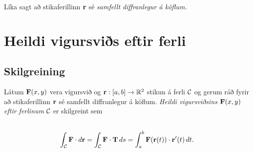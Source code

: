 \documentclass[a4paper,10pt,icelandic]{sphinxmanual}
\begin{document}
Líka sagt að stikaferillinn \(\mbox{${\bf r}$}\) sé \emph{samfellt
diffranlegur á köflum.}


\section{Heildi vigursviðs eftir ferli}
\label{Kafli5:heildi-vigursvis-eftir-ferli}

\subsection{Skilgreining}
\label{Kafli5:id8}
Látum \(\mbox{${\bf F}$}(x,y)\) vera vigursvið og
\(\mbox{${\bf r}$}:[a,b]\rightarrow {\mathbb  R}^2\) stikun á ferli
\(\cal C\) og gerum ráð fyrir að stikaferillinn
\(\mbox{${\bf r}$}\) sé samfellt diffranlegur á köflum. \emph{Heildi
vigursviðsins} \(\mbox{${\bf F}$}(x,y)\) \emph{eftir ferlinum}
\(\cal C\) er skilgreint sem
\begin{gather}
\begin{split}\displaystyle\end{split}\notag\\\begin{split}\int_{\cal C} \mbox{${\bf F}$}\cdot d\mbox{${\bf r}$}= \int_{\cal C} \mbox{${\bf F}$}\cdot \mbox{${\bf T}$}\,ds
=\int_a^b \mbox{${\bf F}$}(\mbox{${\bf r}$}(t))\cdot \mbox{${\bf r}$}'(t)\,dt.\end{split}\notag
\end{gather}
\end{document}
